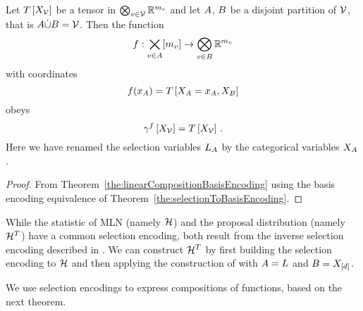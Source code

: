 \begin{lemma}
    \label{lem:inverseSelectionEncoding} %
    Let $T\left[X_{\mathcal{V}}\right]$ be a tensor in $\bigotimes_{v\in\mathcal{V}}\mathbb{R}^{m_{v}}$ and let $A$, $B$ be a disjoint partition of $\mathcal{V}$, that is $A\dot{\cup}B=\mathcal{V}$.
    Then the function
    \[ f : \bigtimes_{v\in A}[m_{v}] \rightarrow \bigotimes_{v\in B} \mathbb{R}^{m_{v}}  \]
    with coordinates
    \[ f(x_{A}) = T\left[X_{A}=x_{A},X_{B}\right]  \]
    obeys
    \[ \gamma^{f}\left[X_{\mathcal{V}}\right] = T\left[X_{\mathcal{V}}\right] \, . \]
    Here we have renamed the selection variables $L_{A}$ by the categorical variables $X_{A}$.
\end{lemma}
\begin{proof}
    From Theorem~\ref{the:linearCompositionBasisEncoding} using the basis encoding equivalence of Theorem~\ref{the:selectionToBasisEncoding}.
\end{proof}


\begin{example}
    While the statistic of MLN (namely $\mathcal{H}$) and the proposal distribution (namely $\mathcal{H}^T$) have a common selection encoding, both result from the inverse selection encoding described in .
    We can construct $\mathcal{H}^T$ by first building the selection encoding to $\mathcal{H}$ and then applying the construction of  with $A=L$ and $B=X_{[d]}$.
\end{example}


We use selection encodings to express compositions of functions, based on the next theorem.

